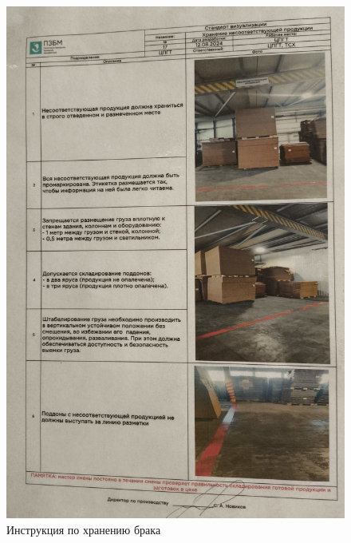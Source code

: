 \begin{figure}
\begin{center}
 \includegraphics[height=0.9\textheight, keepaspectratio]{Pics/VIII как хранить брак.jpg}
\end{center}
 \caption{Инструкция по хранению брака}
 \label{pic:/VIII как хранить брак}
\end{figure}

